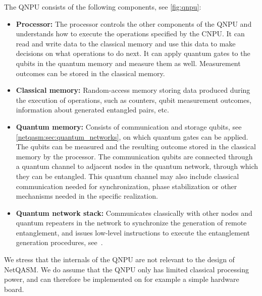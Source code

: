 The \ac{QNPU} consists of the following components, see \cref{fig:qnpu}:
\begin{itemize}
    \item \textbf{Processor:}
            The processor controls the other components of the \ac{QNPU} and understands how to execute the operations specified by the \ac{CNPU}.
            It can read and write data to the classical memory and use this data to make decisions on what operations to do next.
            It can apply quantum gates to the qubits in the quantum memory and measure them as well.
            Measurement outcomes can be stored in the classical memory.
    \item \textbf{Classical memory:}
            Random-access memory storing data produced during the execution of operations, such as counters, qubit measurement outcomes, information about generated entangled pairs, etc.
    \item \textbf{Quantum memory:}
            Consists of communication and storage qubits, see \cref{netqasm:sec:quantum_networks}, on which quantum gates can be applied.
            The qubits can be measured and the resulting outcome stored in the classical memory by the processor.
            The communication qubits are connected through a quantum channel to adjacent nodes in the quantum network, through which they can be entangled.
            This quantum channel may also include classical communication needed for synchronization, phase stabilization or other mechanisms needed in the specific realization.
    \item \textbf{Quantum network stack:}
            Communicates classically with other nodes and quantum repeaters in the network to synchronize the generation of remote entanglement, and issues low-level instructions to execute the entanglement generation procedures, see~\cite{dahlberg2019linklayer,kozlowski2020networklayer}.
\end{itemize}

We stress that the internals of the \ac{QNPU} are not relevant to the design of \ac{NetQASM}.
We do assume that the \ac{QNPU} only has limited classical processing power, and can therefore be implemented on for example a simple hardware board.





